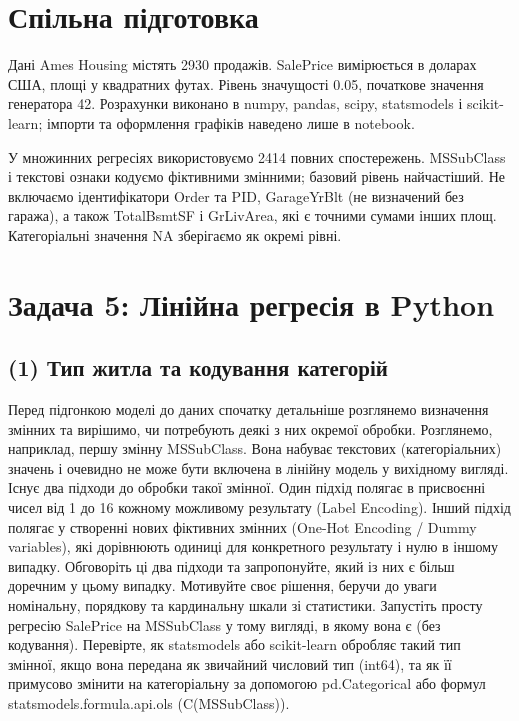 \section*{Спільна підготовка}


Дані Ames Housing містять 2930 продажів. SalePrice вимірюється в доларах
США, площі у квадратних футах. Рівень значущості 0.05, початкове
значення генератора 42. Розрахунки виконано в numpy, pandas, scipy,
statsmodels і scikit-learn; імпорти та оформлення графіків наведено лише
в notebook.

У множинних регресіях використовуємо 2414 повних спостережень.
MSSubClass і текстові ознаки кодуємо фіктивними змінними; базовий рівень
найчастіший. Не включаємо ідентифікатори Order та PID, GarageYrBlt (не
визначений без гаража), а також TotalBsmtSF і GrLivArea, які є точними
сумами інших площ. Категоріальні значення NA зберігаємо як окремі рівні.



\section{Задача 5: Лінійна регресія в Python}


\Needspace{329.0pt}

\subsection{(1) Тип житла та кодування категорій}

\begin{taskstatement}
Перед підгонкою моделі до даних спочатку детальніше розглянемо
визначення змінних та вирішимо, чи потребують деякі з них окремої
обробки. Розглянемо, наприклад, першу змінну MSSubClass. Вона набуває
текстових (категоріальних) значень і очевидно не може бути включена в
лінійну модель у вихідному вигляді. Існує два підходи до обробки такої
змінної. Один підхід полягає в присвоєнні чисел від 1 до 16 кожному
можливому результату (Label Encoding). Інший підхід полягає у створенні
нових фіктивних змінних (One-Hot Encoding / Dummy variables), які
дорівнюють одиниці для конкретного результату і нулю в іншому випадку.
Обговоріть ці два підходи та запропонуйте, який із них є більш доречним
у цьому випадку. Мотивуйте своє рішення, беручи до уваги номінальну,
порядкову та кардинальну шкали зі статистики. Запустіть просту регресію
SalePrice на MSSubClass у тому вигляді, в якому вона є (без кодування).
Перевірте, як statsmodels або scikit-learn обробляє такий тип змінної,
якщо вона передана як звичайний числовий тип (int64), та як її примусово
змінити на категоріальну за допомогою pd.Categorical або формул
statsmodels.formula.api.ols (C(MSSubClass)).
\end{taskstatement}


